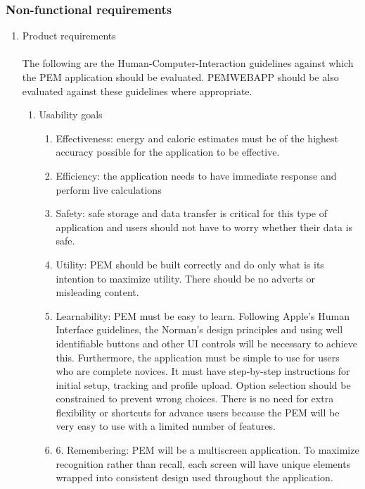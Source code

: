 \documentclass[12pt, a4paper]{report}   %
\begin{document}
\begin{enumerate}
\subsubsection{Non-functional requirements}

\begin{enumerate}
	\item Product requirements\\ \\
	The following are the Human-Computer-Interaction guidelines against which the PEM application should be evaluated. PEMWEBAPP should be also evaluated against these guidelines where appropriate.\\
	\begin{enumerate}
		\item Usability goals
		\begin {enumerate}
			\item Effectiveness: energy and caloric estimates must be of the highest accuracy possible for the application to be effective.
			\item Efficiency: the application needs to have immediate response and perform live calculations 
			\item Safety: safe storage and data transfer is critical for this type of application and users should not have to worry whether their data is safe.
			\item Utility: PEM should be built correctly and do only what is its intention to maximize utility. There should be no adverts or misleading content.
			\item Learnability: PEM must be easy to learn. Following Apple's Human Interface guidelines, the Norman's design principles and using well identifiable buttons and other UI controls will be necessary to achieve this. Furthermore, the application must be simple to use for users who are complete novices. It must have step-by-step instructions for initial setup, tracking and profile upload. Option selection should be constrained to prevent wrong choices. There is no need for extra flexibility or shortcuts for advance users because the PEM will be very easy to use with a limited number of features.
			\item 6. Remembering: PEM will be a multiscreen application. To maximize recognition rather than recall, each screen will have unique elements wrapped into consistent design used throughout the application.\\
		\end{enumerate}


\end{enumerate}
\end{enumerate}
\end{enumerate}
\end{document}
